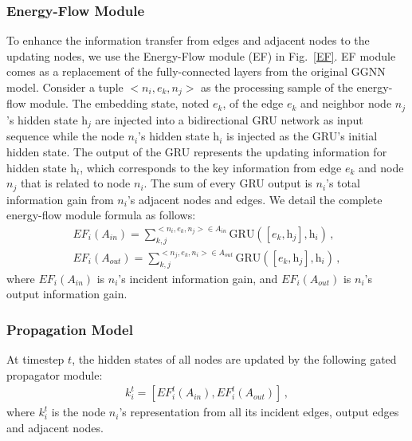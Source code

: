 \documentclass[letterpaper]{article} %
\begin{document}
\subsubsection{Energy-Flow Module}
To enhance the information transfer from edges and adjacent nodes to the updating nodes, we use the Energy-Flow module (EF) in Fig.~\ref{EF}.
EF module comes as a replacement of the fully-connected layers from the original GGNN model. 
Consider a tuple $<{n}_i, {e}_k, {n}_j>$ as the processing sample of the energy-flow module. 
The embedding state, noted $\textit{e}_k$, of the edge ${e}_k$ and neighbor node ${n}_j$'s hidden state $\textit{h}_j$ are injected into a bidirectional GRU network as input sequence while the node ${n}_i$'s hidden state $\textit{h}_i$ is injected as the GRU's initial hidden state. 
The output of the GRU represents the updating information for hidden state $\textit{h}_i$, which corresponds to the key information from edge ${e}_k$ and node ${n}_j$ that is related to node ${n}_i$. 
The sum of every GRU output is ${n}_i$'s total information gain from ${n}_i$'s adjacent nodes and edges. 
We detail the complete energy-flow module formula as follows:
\begin{gather}
    EF_i(A_{in}) = \sum\limits_{k,j}^{<n_i,e_k,n_j>\in A_{in}} \text{GRU}([\textit{e}_k, \textit{h}_j], \textit{h}_i) \, , \\ 
    EF_i(A_{out}) = \sum\limits_{k,j}^{<{n}_j,{e}_k,{n}_i>\in A_{out}} \text{GRU}([\textit{e}_k, \textit{h}_j], \textit{h}_i) \, ,
\end{gather}
where $EF_i(A_{in})$ is ${n}_i$'s incident information gain, and $EF_i(A_{out})$ is ${n}_i$'s output information gain.



\subsubsection{Propagation Model}

At timestep $t$, the hidden states of all nodes are updated by the following gated propagator module:
\begin{gather}
    k_{i}^t = [EF_i^t(A_{in}), EF_i^t(A_{out})] \, ,
\end{gather}
where $k_{i}^t$ is the node ${n}_i$'s representation from all its incident edges, output edges and adjacent nodes.
\end{document}
